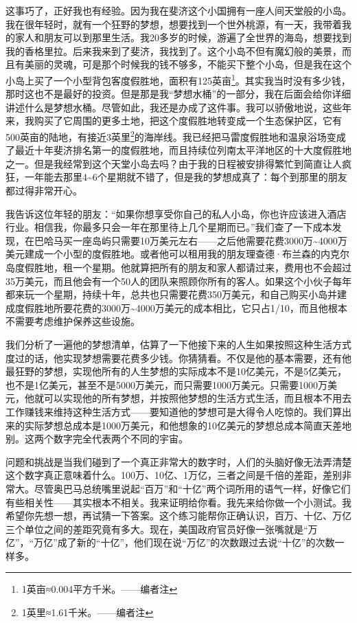 这事巧了，正好我也有经验。因为我在斐济这个小国拥有一座人间天堂般的小岛。我在很年轻时，就有一个狂野的梦想，想要找到一个世外桃源，有一天，我带着我的家人和朋友可以到那里生活。我20多岁的时候，游遍了全世界的海岛，想要找到我的香格里拉。后来我来到了斐济，我找到了。这个小岛不但有魔幻般的美景，而且有美丽的灵魂，可是那个时候我的钱不够多，不能买下整个小岛，但是我在这个小岛上买了一个小型背包客度假胜地，面积有125英亩\footnote{\label{fn:pdf-15-1}1英亩≈0.004平方千米。——编者注}。其实我当时没有多少钱，那时这也不是最好的投资。但是那是我“梦想水桶”的一部分，我在后面会给你详细讲述什么是梦想水桶。尽管如此，我还是办成了这件事。我可以骄傲地说，这些年来，我购买了它周围的更多土地，把这个度假胜地转变成一个生态保护区，它有500英亩的陆地，有接近3英里\footnote{\label{fn:pdf-15-2}1英里≈1.61千米。——编者注}的海岸线。我已经把马雷度假胜地和温泉浴场变成了最近十年斐济排名第一的度假胜地，而且持续位列南太平洋地区的十大度假胜地之一。但是我经常到这个天堂小岛去吗？由于我的日程被安排得繁忙到简直让人疯狂，一年能去那里4\textasciitilde{}6个星期就不错了，但是我的梦想成真了：每个到那里的朋友都过得非常开心。

我告诉这位年轻的朋友：“如果你想享受你自己的私人小岛，你也许应该进入酒店行业。相信我，你最多只会一年在那里待上几个星期而已。”我们查了一下成本发现，在巴哈马买一座岛屿只需要10万美元左右——之后他需要花费3000万\textasciitilde{}4000万美元建成一个小型的度假胜地。或者他可以租用我的朋友理查德·布兰森的内克尔岛度假胜地，租一个星期。他就算把所有的朋友和家人都请过来，费用也不会超过35万美元，而且他会有一个50人的团队来照顾你所有的客人。如果这个小伙子每年都来玩一个星期，持续十年，总共也只需要花费350万美元，和自己购买小岛并建成度假胜地所要花费的3000万\textasciitilde{}4000万美元的成本相比，它只占1/10，而且他根本不需要考虑维护保养这些设施。

我们分析了一遍他的梦想清单，估算了一下他接下来的人生如果按照这种生活方式度过的话，他实现梦想需要花费多少钱。你猜猜看。不仅是他的基本需要，还有他最狂野的梦想，实现他所有的人生梦想的实际成本不是10亿美元，不是5亿美元，也不是1亿美元，甚至不是5000万美元，而只需要1000万美元。只需要1000万美元，他就可以实现他的所有梦想，并按照他梦想的生活方式生活，而且根本不用去工作赚钱来维持这种生活方式——要知道他的梦想可是大得令人吃惊的。我们算出来的实际梦想总成本是1000万美元，和他想象的10亿美元的梦想总成本简直天差地别。这两个数字完全代表两个不同的宇宙。

问题和挑战是当我们碰到了一个真正非常大的数字时，人们的头脑好像无法弄清楚这个数字真正意味着什么。100万、10亿、1万亿，三者之间是千倍的差距，差别非常大。尽管奥巴马总统嘴里说起“百万”和“十亿”两个词所用的语气一样，好像它们有些相关性——其实根本不相关。我来证明给你看。我先来给你做一个小测试。我希望你先想一想，再试猜一下答案。这个练习能帮你正确认识，百万、十亿、万亿三个单位之间的差距究竟有多大。现在，美国政府官员好像一张嘴就是“万亿”，“万亿”成了新的“十亿”，他们现在说“万亿”的次数跟过去说“十亿”的次数一样多。

